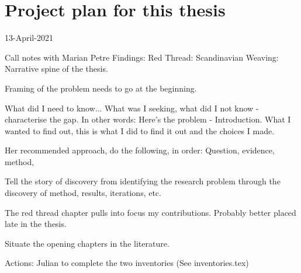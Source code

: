 \section{Project plan for this thesis}
\label{section_thesis_project_plan}

13-April-2021 

Call notes with Marian Petre
Findings:
Red Thread: Scandinavian Weaving: Narrative spine of the thesis.

Framing of the problem needs to go at the beginning. 

What did I need to know... What was I seeking, what did I not know - characterise the gap. In other words: Here's the problem - Introduction. What I wanted to find out, this is what I did to find it out and the choices I made.

Her recommended approach, do the following, in order: 
Question, evidence, method, 

Tell the story of discovery from identifying the research problem through the discovery of method, results, iterations, etc.

The red thread chapter pulls into focus my contributions. Probably better placed late in the thesis. 

Situate the opening chapters in the literature.

Actions: Julian to complete the two inventories (See inventories.tex)